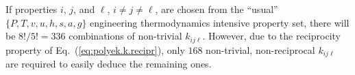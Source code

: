     If properties $i$, $j$, and $\ell$, $i \neq j \neq \ell$,  are  chosen  from  the  ``usual''
    $\{P, T, v, u, h, s, a, g\}$ engineering thermodynamics intensive property set,  there  will
    be $8!/5! = 336$ combinations of non-trivial $k_{ij\ell}$. However, due to  the  reciprocity
    property  of  Eq.~(\ref{eq:polyek.k.recipr}),   only   $168$   non-trivial,   non-reciprocal
    $k_{ij\ell}$ are required to easily deduce the remaining ones.


